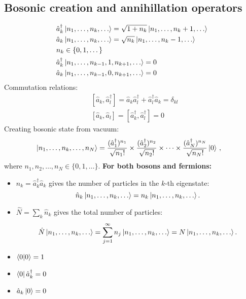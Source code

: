 \documentclass[11pt, a4paper]{article}
\begin{document}
\subsection{Bosonic creation and annihillation operators}
\begin{align*}
    &\hat a_k^{\dagger} \ket{n_1, \dots, n_k, \dots} = \sqrt{1+n_k}\ket{n_1, \dots, n_k + 1, \dots} \\
    &\hat a_k \ket{n_1, \dots, n_k, \dots} = \sqrt{n_k} \ket{n_1, \dots, n_k - 1, \dots} \\
    &n_k \in \{0,1,\dots\}\\
    &\hat a_k^{\dagger} \ket{n_1, \dots, n_{k-1}, 1, n_{k+1},\dots} = 0 \\
    &\hat a_k \ket{n_1, \dots, n_{k-1}, 0, n_{k+1},\dots} = 0\\
\end{align*}
Commutation relations:
\begin{align*}
    &[\hat a_k, \hat a_l^{\dagger}]  = \hat a_k\hat a_l^{\dagger}+\hat a_l^{\dagger}\hat a_k = \delta_{kl}\\
    &[\hat a_k, \hat a_l] = [ \hat a_k^{\dagger}, \hat a_l^{\dagger} ] = 0
\end{align*}
Creating bosonic state from vacuum:
\begin{align*}
    &\ket{n_1, \dots, n_k, \dots, n_N} = \frac{(\hat a_1^{\dagger})^{n_1}}{\sqrt{n_1!}} \times \frac{(\hat a_2^{\dagger})^{n_2}}{\sqrt{n_2!}}
    \times \dots \times \frac{(\hat a_N^{\dagger})^{n_N}}{\sqrt{n_N!}} \ket{0}\,,
\end{align*}
where $n_1, n_2, \dots ,n_N \in \{0,1,\dots\}$.
\textbf{For both bosons and fermions:}
\begin{itemize}
    \item $\hat n_k = \hat a_k^{\dagger}\hat a_k $ gives the number of particles in the $k$-th eigenstate:
    \begin{equation*}
        \hat n_k \ket{n_1, \dots, n_k, \dots} = n_k \ket{n_1, \dots, n_k, \dots}.
    \end{equation*}
    \item $\hat N = \sum\limits_k \hat n_k$ gives the total number of particles:
    \begin{equation*}
        \hat N \ket{n_1, \dots, n_k, \dots} = \sum\limits_{j=1}^{\infty}n_j \ket{n_1, \dots, n_k, \dots}
        = N \ket{n_1, \dots, n_k, \dots}.
    \end{equation*}
    \item $\braket{0|0} = 1$
    \item $\bra 0 \hat a_k^{\dagger} = 0$
    \item $\hat a_k \ket 0 = 0$
\end{itemize}
\end{document}
